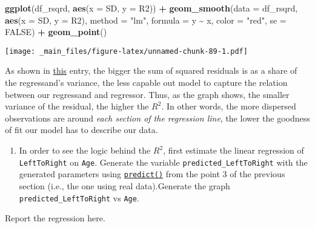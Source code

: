 \documentclass[
]{book}
\newenvironment{Shaded}{\begin{snugshade}}{\end{snugshade}}
\newcommand{\AttributeTok}[1]{\textcolor[rgb]{0.13,0.29,0.53}{#1}}
\newcommand{\ConstantTok}[1]{\textcolor[rgb]{0.56,0.35,0.01}{#1}}
\newcommand{\FunctionTok}[1]{\textcolor[rgb]{0.13,0.29,0.53}{\textbf{#1}}}
\newcommand{\NormalTok}[1]{#1}
\newcommand{\SpecialCharTok}[1]{\textcolor[rgb]{0.81,0.36,0.00}{\textbf{#1}}}
\newcommand{\StringTok}[1]{\textcolor[rgb]{0.31,0.60,0.02}{#1}}
\providecommand{\tightlist}{%
  \setlength{\itemsep}{0pt}\setlength{\parskip}{0pt}}
\begin{document}
\begin{Shaded}
\begin{Highlighting}[]
\FunctionTok{ggplot}\NormalTok{(df\_rsqrd, }\FunctionTok{aes}\NormalTok{(}\AttributeTok{x =}\NormalTok{ SD, }\AttributeTok{y =}\NormalTok{ R2)) }\SpecialCharTok{+}
  \FunctionTok{geom\_smooth}\NormalTok{(}\AttributeTok{data =}\NormalTok{ df\_rsqrd, }\FunctionTok{aes}\NormalTok{(}\AttributeTok{x =}\NormalTok{ SD, }\AttributeTok{y =}\NormalTok{ R2), }
              \AttributeTok{method =} \StringTok{"lm"}\NormalTok{, }\AttributeTok{formula =}\NormalTok{ y }\SpecialCharTok{\textasciitilde{}}\NormalTok{ x, }\AttributeTok{color =} \StringTok{"red"}\NormalTok{, }\AttributeTok{se =} \ConstantTok{FALSE}\NormalTok{) }\SpecialCharTok{+}
  \FunctionTok{geom\_point}\NormalTok{()}
\end{Highlighting}
\end{Shaded}

\texttt{[image: \_main\_files/figure-latex/unnamed-chunk-89-1.pdf]}

As shown in \href{https://en.wikipedia.org/wiki/Coefficient_of_determination}{this} entry, the bigger the sum of squared residuals is as a share of the regressand's variance, the less capable out model to capture the relation between our regressand and regressor. Thus, as the graph shows, the smaller variance of the residual, the higher the \(R^2\). In other words, the more dispersed observations are around \emph{each section of the regression line}, the lower the goodness of fit our model has to describe our data.

\begin{enumerate}
\def\labelenumi{\arabic{enumi}.}
\setcounter{enumi}{2}
\tightlist
\item
  In order to see the logic behind the \(R^2\), first estimate the linear regression of \texttt{LeftToRight} on \texttt{Age}. Generate the variable \texttt{predicted\_LeftToRight} with the generated parameters using \href{https://www.statology.org/r-lm-predict/}{\texttt{predict()}} from the point 3 of the previous section (i.e., the one using real data).Generate the graph \texttt{predicted\_LeftToRight} vs \texttt{Age}.
\end{enumerate}

Report the regression here.
\end{document}
